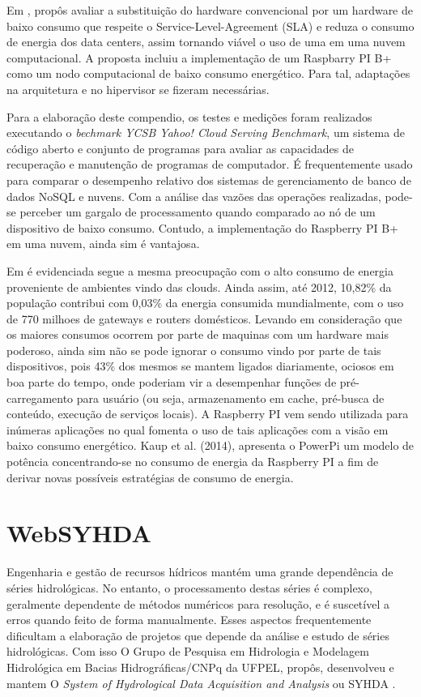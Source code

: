 \documentclass[12pt,english,brazil]{article}
\begin{document}
Em \cite{Joao}, propôs avaliar a substituição do hardware convencional por um hardware de baixo consumo que respeite o Service-Level-Agreement (SLA) e reduza o consumo de energia dos data centers, assim tornando viável o uso de uma em uma nuvem computacional. A proposta incluiu a implementação de um Raspbarry PI B+ como um nodo computacional de baixo consumo energético. Para tal, adaptações na arquitetura e no hipervisor  se fizeram necessárias.

Para a elaboração deste compendio, os testes e medições foram realizados executando o \emph{bechmark YCSB Yahoo! Cloud Serving Benchmark}, um sistema de código aberto e conjunto de programas para avaliar as capacidades de recuperação e manutenção de programas de computador. É frequentemente usado para comparar o desempenho relativo dos sistemas de gerenciamento de banco de dados NoSQL e nuvens. Com a análise das vazões das operações realizadas, pode-se perceber um gargalo de processamento quando comparado ao nó de um dispositivo de baixo consumo. Contudo, a implementação do Raspberry PI B+ em uma nuvem, ainda sim é vantajosa.

Em \cite{PiConsumo} é evidenciada segue a mesma preocupação com o alto consumo de energia proveniente de ambientes vindo das clouds. Ainda assim, até 2012, 10,82\% da população contribui com 0,03\% da energia consumida mundialmente, com o uso de 770 milhoes de gateways e routers domésticos. Levando em consideração que os maiores consumos ocorrem por parte de maquinas com um hardware mais poderoso, ainda sim não se pode ignorar o consumo vindo por parte de tais dispositivos, pois 43\% dos mesmos se mantem ligados diariamente, ociosos em boa parte do tempo, onde poderiam vir a desempenhar funções de pré-carregamento para usuário (ou seja, armazenamento em cache, pré-busca de conteúdo, execução de serviços locais). A Raspberry PI vem sendo utilizada para inúmeras aplicações no qual fomenta o uso de tais aplicações com a visão em baixo consumo energético. Kaup et al. (2014), apresenta o PowerPi um modelo de  potência concentrando-se no consumo de energia da Raspberry PI a fim de derivar novas possíveis estratégias de consumo de energia.



\section{WebSYHDA}\label{sec:websyhda}

Engenharia e gestão de recursos hídricos mantém uma grande dependência de séries hidrológicas. No entanto, o processamento destas séries é complexo, geralmente dependente de métodos numéricos para resolução, e é suscetível a erros quando feito de forma manualmente. Esses aspectos frequentemente dificultam a elaboração de projetos que depende da análise e estudo de séries hidrológicas. Com isso O Grupo de Pesquisa em Hidrologia e Modelagem Hidrológica em Bacias Hidrográficas/CNPq da UFPEL, propôs, desenvolveu e mantem O \emph{System of Hydrological Data Acquisition and Analysis} ou SYHDA \cite{syhda}.
\end{document}
